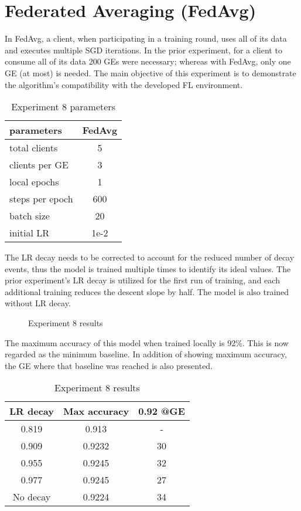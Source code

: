 \section{Federated Averaging (FedAvg)}
In FedAvg, a client, when participating in a training round, uses all of its data and executes multiple SGD iterations. In the prior experiment, for a client to consume all of its data 200 GEs were necessary; whereas with FedAvg, only one GE (at most) is needed. The main objective of this experiment is to demonstrate the algorithm's compatibility with the developed FL environment.
\begin{table}[H]
    \center
    \begin{tabular}
        { | l | c | }
        \hline
        parameters & FedAvg\\\hline
        total clients   & 5\\\hline
        clients per GE  & 3\\\hline
        local epochs    & 1\\\hline
        steps per epoch & 600\\\hline
        batch size      & 20\\\hline
        initial LR      &  1e-2\\\hline
    \end{tabular}
    \caption[Experiment 8 parameters]{Experiment 8 parameters}
    \label{table:Experiment 8 parameters}
\end{table}
The LR decay needs to be corrected to account for the reduced number of decay events, thus the model is trained multiple times to identify its ideal values. The prior experiment's LR decay is utilized for the first run of training, and each additional training reduces the descent slope by half. The model is also trained without LR decay.
\begin{figure}[H]
    \center
    
    \caption[Experiment 8 results]{Experiment 8 results}
    \label{fig:Experiment 8 results}
\end{figure}
The maximum accuracy of this model when trained locally is 92\%. This is now regarded as the minimum baseline. In addition of showing maximum accuracy, the GE where that baseline was reached is also presented.
\begin{table}[H]
    \center
    \begin{tabular}
        { | c | c | c | }
        \hline
        LR decay & Max accuracy & 0.92 @GE\\\hline
        0.819 & 0.913 & -\\\hline
        0.909 & 0.9232 & 30\\\hline
        0.955 & 0.9245 & 32\\\hline
        0.977 & 0.9245 & 27\\\hline
        No decay & 0.9224 & 34\\\hline
    \end{tabular}
    \caption[Experiment 8 results]{Experiment 8 results}
    \label{table:Experiment 8 results}
\end{table}
